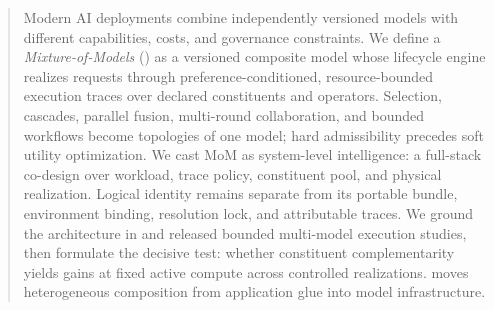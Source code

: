 \begin{abstract}
Modern AI deployments combine independently versioned models with different
capabilities, costs, and governance constraints. We define a
\emph{Mixture-of-Models} (\mom) as a versioned
composite model whose lifecycle engine realizes requests through
preference-conditioned, resource-bounded execution traces over declared
constituents and operators. Selection, cascades, parallel fusion, multi-round
collaboration, and bounded workflows become topologies of one model; hard
admissibility precedes soft utility optimization. We cast MoM as system-level
intelligence: a full-stack co-design over workload, trace policy, constituent
pool, and physical realization. Logical identity remains separate from its
portable bundle, environment binding, resolution lock, and attributable
traces. We ground the architecture in \vsr{} and released bounded multi-model
execution studies, then formulate the decisive test: whether constituent
complementarity yields gains at fixed active compute across controlled
realizations. \mom{} moves heterogeneous composition from application glue
into model infrastructure.
\end{abstract}
